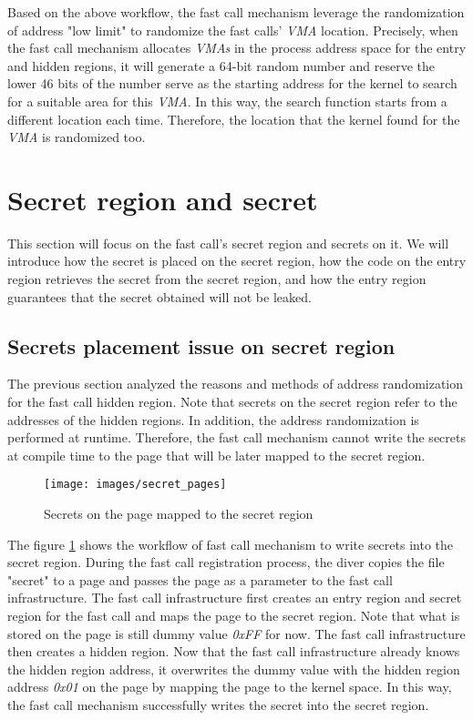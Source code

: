 Based on the above workflow, the fast call mechanism leverage the randomization 
of address "low limit" to randomize the fast calls' \emph{VMA} location. Precisely,  
when the fast call mechanism allocates \emph{VMAs} in the process address space for 
the entry and hidden regions, it will generate a 64-bit random number and 
reserve the lower 46  bits of the number serve as the starting address for 
the kernel to search for a suitable area for this \emph{VMA}. In this way, the search 
function starts from a different location each time. Therefore,  the location 
that the kernel found for the \emph{VMA} is randomized too. 

\section{Secret region and secret}

This section will focus on the fast call's secret region and 
secrets on it. We will introduce how the secret is placed on the secret region, how the code on 
the entry region retrieves the secret from the secret region, 
and how the entry region guarantees that the secret obtained will not be leaked.

\subsection{Secrets placement issue on secret region}
The previous section analyzed the reasons and methods of address randomization 
for the fast call hidden region. Note that secrets on the secret region refer 
to the addresses of the hidden regions. In addition, the address randomization 
is performed at runtime. Therefore, the fast call mechanism cannot write the 
secrets at compile time to the page that will be later mapped to the secret region.

\begin{figure}[tbp]
  \centering
  \texttt{[image: images/secret\_pages]}
  \caption[Short description]{Secrets on the page mapped to the secret region}
  \label{fig:secret_pages}
\end{figure}

The figure \ref{fig:secret_pages} shows the workflow of fast call mechanism to write secrets into the secret region. 
During the fast call registration process,
the diver copies the file "secret" to a page and passes the page as a parameter to
 the fast call infrastructure. The fast call infrastructure first creates an entry 
 region and secret region for the fast call and maps the page to the secret region. 
 Note that what is stored on the page is still dummy value \emph{0xFF} for now. The fast call 
 infrastructure then creates a hidden region. Now that the fast call infrastructure 
 already knows the hidden region address, it overwrites the dummy value with the hidden 
 region address \emph{0x01} on the page by mapping the page to the kernel space. In this way, the fast call mechanism 
 successfully writes the secret into the secret region.


